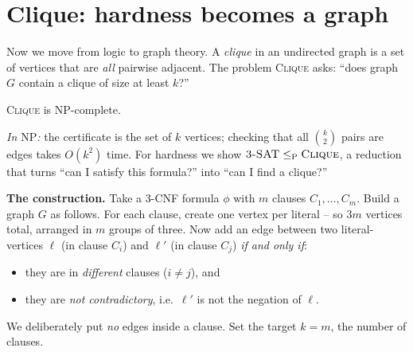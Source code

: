 \section{Clique: hardness becomes a graph}

Now we move from logic to graph theory. A \emph{clique} in an undirected graph
is a set of vertices that are \emph{all} pairwise adjacent. The problem
\textsc{Clique} asks: ``does graph $G$ contain a clique of size at least $k$?''

\begin{theorem}
\label{ch33:clique}
\textsc{Clique} is NP-complete.
\end{theorem}

\emph{In $\mathrm{NP}$:} the certificate is the set of $k$ vertices; checking that
all $\binom{k}{2}$ pairs are edges takes $O(k^2)$ time. For hardness we show
$\textsc{3-SAT}\le_{\mathrm P}\textsc{Clique}$, a reduction that turns
``can I satisfy this formula?'' into ``can I find a clique?''

\textbf{The construction.} Take a 3-CNF formula $\phi$ with $m$ clauses
$C_1,\dots,C_m$. Build a graph $G$ as follows. For each clause, create one vertex
per literal -- so $3m$ vertices total, arranged in $m$ groups of three. Now add an
edge between two literal-vertices $\ell$ (in clause $C_i$) and $\ell'$ (in clause
$C_j$) \emph{if and only if}:
\begin{itemize}
  \item they are in \emph{different} clauses ($i\ne j$), and
  \item they are \emph{not contradictory}, i.e.\ $\ell'$ is not the negation of
        $\ell$.
\end{itemize}
We deliberately put \emph{no} edges inside a clause. Set the target $k=m$, the
number of clauses.


